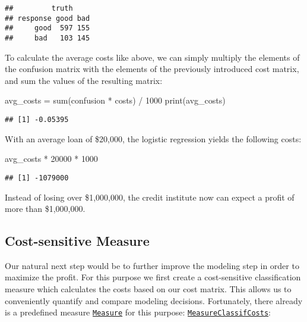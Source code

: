 \documentclass[
]{scrbook}
\newenvironment{Shaded}{\begin{snugshade}}{\end{snugshade}}
\newcommand{\DecValTok}[1]{\textcolor[rgb]{0.00,0.00,0.81}{#1}}
\newcommand{\FunctionTok}[1]{\textcolor[rgb]{0.00,0.00,0.00}{#1}}
\newcommand{\NormalTok}[1]{#1}
\newcommand{\OtherTok}[1]{\textcolor[rgb]{0.56,0.35,0.01}{#1}}
\newcommand{\SpecialCharTok}[1]{\textcolor[rgb]{0.00,0.00,0.00}{#1}}
\renewenvironment{Shaded} {\begin{snugshade}\small} {\end{snugshade}}
\begin{document}
\begin{verbatim}
##         truth
## response good bad
##     good  597 155
##     bad   103 145
\end{verbatim}

To calculate the average costs like above, we can simply multiply the elements of the confusion matrix with the elements of the previously introduced cost matrix, and sum the values of the resulting matrix:

\begin{Shaded}
\begin{Highlighting}[]
\NormalTok{avg\_costs }\OtherTok{=} \FunctionTok{sum}\NormalTok{(confusion }\SpecialCharTok{*}\NormalTok{ costs) }\SpecialCharTok{/} \DecValTok{1000}
\FunctionTok{print}\NormalTok{(avg\_costs)}
\end{Highlighting}
\end{Shaded}

\begin{verbatim}
## [1] -0.05395
\end{verbatim}

With an average loan of \$20,000, the logistic regression yields the following costs:

\begin{Shaded}
\begin{Highlighting}[]
\NormalTok{avg\_costs }\SpecialCharTok{*} \DecValTok{20000} \SpecialCharTok{*} \DecValTok{1000}
\end{Highlighting}
\end{Shaded}

\begin{verbatim}
## [1] -1079000
\end{verbatim}

Instead of losing over \$1,000,000, the credit institute now can expect a profit of more than \$1,000,000.

\hypertarget{cost-sensitive-measure}{%
\subsection{Cost-sensitive Measure}\label{cost-sensitive-measure}}

Our natural next step would be to further improve the modeling step in order to maximize the profit.
For this purpose we first create a cost-sensitive classification measure which calculates the costs based on our cost matrix.
This allows us to conveniently quantify and compare modeling decisions.
Fortunately, there already is a predefined measure \href{https://mlr3.mlr-org.com/reference/Measure.html}{\texttt{Measure}} for this purpose: \href{https://mlr3.mlr-org.com/reference/mlr_measures_classif.costs.html}{\texttt{MeasureClassifCosts}}:
\end{document}
